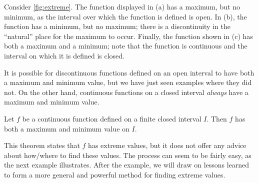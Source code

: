 Consider \autoref{fig:extreme}. The function displayed in (a) has a maximum, but no minimum, as the interval over which the function is defined is open. In (b), the function has a minimum, but no maximum; there is a discontinuity in the ``natural'' place for the maximum to occur. Finally, the function shown in (c) has both a maximum and a minimum; note that the function is continuous and the interval on which it is defined is closed. 
 
It is possible for discontinuous functions defined on an open interval to have both a maximum and minimum value, but we have just seen examples where they did not. On the other hand, continuous functions on a closed interval \textit{always} have a maximum and minimum value.
 
%
{Let $f$ be a continuous function defined on a finite closed interval $I$. Then $f$ has both a maximum and minimum value on $I$.%
}


This theorem states that $f$ has extreme values, but it does not offer any advice about how/where to find these values. The process can seem to be fairly easy, as the next example illustrates. After the example, we will draw on lessons learned to form a more general and powerful method for finding extreme values.


